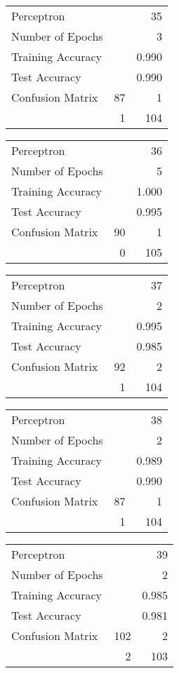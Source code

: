 \documentclass[11pt,twocolumn]{article}
\begin{document}
\begin{center}
\begin{tabular}{l | r r}
Perceptron &&35\\
Number of Epochs & &3\\
Training Accuracy & &0.990\\
Test Accuracy & &0.990\\
Confusion Matrix &87 & 1\\
 &1 & 104\\
\end{tabular}
\end{center}
\begin{center}
\begin{tabular}{l | r r}
Perceptron &&36\\
Number of Epochs & &5\\
Training Accuracy & &1.000\\
Test Accuracy & &0.995\\
Confusion Matrix &90 & 1\\
 &0 & 105\\
\end{tabular}
\end{center}
\begin{center}
\begin{tabular}{l | r r}
Perceptron &&37\\
Number of Epochs & &2\\
Training Accuracy & &0.995\\
Test Accuracy & &0.985\\
Confusion Matrix &92 & 2\\
 &1 & 104\\
\end{tabular}
\end{center}
\begin{center}
\begin{tabular}{l | r r}
Perceptron &&38\\
Number of Epochs & &2\\
Training Accuracy & &0.989\\
Test Accuracy & &0.990\\
Confusion Matrix &87 & 1\\
 &1 & 104\\
\end{tabular}
\end{center}
\begin{center}
\begin{tabular}{l | r r}
Perceptron &&39\\
Number of Epochs & &2\\
Training Accuracy & &0.985\\
Test Accuracy & &0.981\\
Confusion Matrix &102 & 2\\
 &2 & 103\\
\end{tabular}
\end{center}
\end{document}
